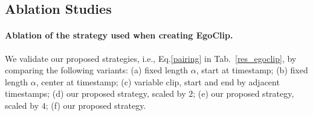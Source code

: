 \documentclass{article}
\newcommand{\dataset}{EgoClip}
\newcommand{\eval}{EgoMCQ}
\newcommand{\epic}{EPIC-KITCHENS-100}
\begin{document}
\begin{table}[!t]
\small
\centering
\setlength{\tabcolsep}{3pt}
\vspace{-.8em}
\centering
\vspace{.5em}
\caption{Results on our development set \eval~and video-text retrieval on \epic~when using different strategies in the creation of \dataset, where $t_i$, $\alpha$, $\beta_i$ are defined in Eq.~\ref{pairing}.\\
In all experiments, we bold the \textbf{best results} and underlined \underline{the second best results}.
}
\vspace{-2.4em}
\label{res_egoclip}
\end{table} \subsection{Ablation Studies}
\paragraph{Ablation of the strategy used when creating \dataset.}
We validate our proposed strategies, i.e., Eq.\ref{pairing} in Tab.~\ref{res_egoclip}, by comparing the following variants:
(a) fixed length $\alpha$, start at timestamp;
(b) fixed length $\alpha$, center at timestamp;
(c) variable clip, start and end by adjacent timestamps;
(d) our proposed strategy, scaled by $2$;
(e) our proposed strategy, scaled by $4$;
(f) our proposed strategy.
\end{document}
